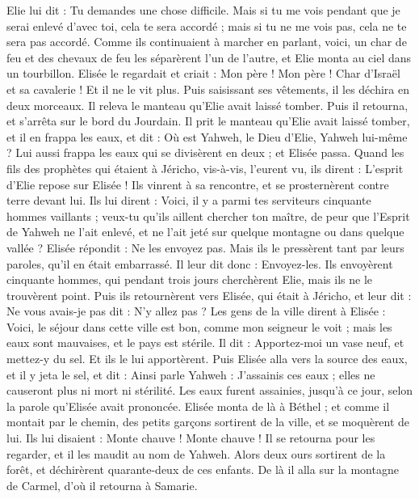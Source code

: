 \begin{multicols}{2}
Elie lui dit : Tu demandes une chose difficile. Mais si tu me vois pendant que je serai enlevé d’avec toi, cela te sera accordé ; mais si tu ne me vois pas, cela ne te sera pas accordé.
Comme ils continuaient à marcher en parlant, voici, un char de feu et des chevaux de feu les séparèrent l’un de l’autre, et Elie monta au ciel dans un tourbillon.
Elisée le regardait et criait : Mon père ! Mon père ! Char d’Israël et sa cavalerie ! Et il ne le vit plus. Puis saisissant ses vêtements, il les déchira en deux morceaux.
Il releva le manteau qu’Elie avait laissé tomber. Puis il retourna, et s’arrêta sur le bord du Jourdain.
Il prit le manteau qu’Elie avait laissé tomber, et il en frappa les eaux, et dit : Où est Yahweh, le Dieu d’Elie, Yahweh lui-même ? Lui aussi frappa les eaux qui se divisèrent en deux ; et Elisée passa.
Quand les fils des prophètes qui étaient à Jéricho, vis-à-vis, l’eurent vu, ils dirent : L’esprit d’Elie repose sur Elisée ! Ils vinrent à sa rencontre, et se prosternèrent contre terre devant lui.
Ils lui dirent : Voici, il y a parmi tes serviteurs cinquante hommes vaillants ; veux-tu qu’ils aillent chercher ton maître, de peur que l’Esprit de Yahweh ne l’ait enlevé, et ne l’ait jeté sur quelque montagne ou dans quelque vallée ? Elisée répondit : Ne les envoyez pas.
Mais ils le pressèrent tant par leurs paroles, qu’il en était embarrassé. Il leur dit donc : Envoyez-les. Ils envoyèrent cinquante hommes, qui pendant trois jours cherchèrent Elie, mais ils ne le trouvèrent point.
Puis ils retournèrent vers Elisée, qui était à Jéricho, et leur dit : Ne vous avais-je pas dit : N’y allez pas ?
Les gens de la ville dirent à Elisée : Voici, le séjour dans cette ville est bon, comme mon seigneur le voit ; mais les eaux sont mauvaises, et le pays est stérile.
Il dit : Apportez-moi un vase neuf, et mettez-y du sel. Et ils le lui apportèrent.
Puis Elisée alla vers la source des eaux, et il y jeta le sel, et dit : Ainsi parle Yahweh : J’assainis ces eaux ; elles ne causeront plus ni mort ni stérilité.
Les eaux furent assainies, jusqu’à ce jour, selon la parole qu’Elisée avait prononcée.
Elisée monta de là à Béthel ; et comme il montait par le chemin, des petits garçons sortirent de la ville, et se moquèrent de lui. Ils lui disaient : Monte chauve ! Monte chauve !
Il se retourna pour les regarder, et il les maudit au nom de Yahweh. Alors deux ours sortirent de la forêt, et déchirèrent quarante-deux de ces enfants.
De là il alla sur la montagne de Carmel, d’où il retourna à Samarie.

\end{multicols}
